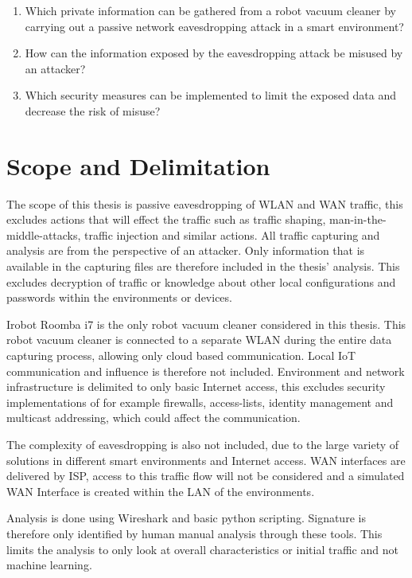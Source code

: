 \begin{enumerate}
    \item Which private information can be gathered from a robot vacuum cleaner by carrying out a passive network eavesdropping attack in a smart environment?
    \item How can the information exposed by the eavesdropping attack be misused by an attacker?
    \item Which security measures can be implemented to limit the exposed data and decrease the risk of misuse?
\end{enumerate}

\section{Scope and Delimitation}

The scope of this thesis is passive eavesdropping of \gls{WLAN} and \gls{WAN} traffic, this excludes actions that will effect the traffic such as traffic shaping, man-in-the-middle-attacks, traffic injection and similar actions. All traffic capturing and analysis are from the perspective of an attacker. Only information that is available in the capturing files are therefore included in the thesis' analysis. This excludes decryption of traffic or knowledge about other local configurations and passwords within the environments or devices. 

Irobot Roomba i7 is the only robot vacuum cleaner considered in this thesis. This robot vacuum cleaner is connected to a separate \gls{WLAN} during the entire data capturing process, allowing only cloud based communication. Local \gls{IoT} communication and influence is therefore not included. Environment and network infrastructure is delimited to only basic Internet access, this excludes security implementations of for example firewalls, access-lists, identity management and multicast addressing, which could affect the communication. 

The complexity of eavesdropping is also not included, due to the large variety of solutions in different smart environments and Internet access. \gls{WAN} interfaces are delivered by \gls{ISP}, access to this traffic flow will not be considered and a simulated \gls{WAN} Interface is created within the \gls{LAN} of the environments. 

Analysis is done using Wireshark and basic python scripting. Signature is therefore only identified by human manual analysis through these tools. This limits the analysis to only look at overall characteristics or initial traffic and not machine learning.

